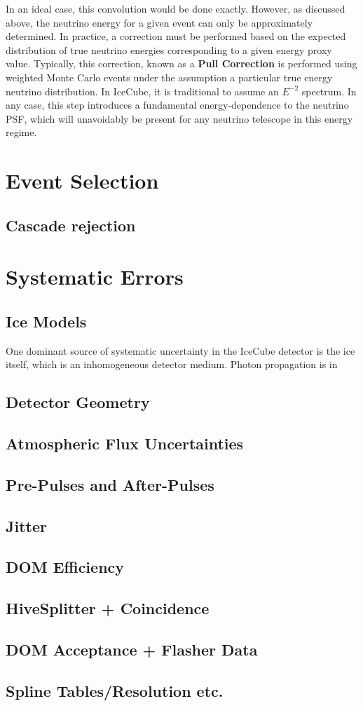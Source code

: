 In an ideal case, this convolution would be done exactly. However, as discussed above, the neutrino energy for a given event can only be approximately determined. In practice, a correction must be performed based on the expected distribution of true neutrino energies corresponding to a given energy proxy value. Typically, this correction, known as a \textbf{Pull Correction} is performed using weighted Monte Carlo events under the assumption a particular true energy neutrino distribution. In IceCube, it is traditional to assume an $E^{-2}$  spectrum. In any case, this step introduces a fundamental energy-dependence to the neutrino PSF, which will unavoidably be present for any neutrino telescope in this energy regime. 


\section{Event Selection}
\subsection{Cascade rejection}
\section{Systematic Errors}
\subsection{Ice Models}
One dominant source of systematic uncertainty in the IceCube detector is the ice itself, which is an inhomogeneous detector medium. Photon propagation is in
\subsection{Detector Geometry}
\subsection{Atmospheric Flux Uncertainties}
\subsection{Pre-Pulses and After-Pulses}
\subsection{Jitter}
\subsection{DOM Efficiency}
\subsection{HiveSplitter + Coincidence}
\subsection{DOM Acceptance + Flasher Data}
\subsection{Spline Tables/Resolution etc.}